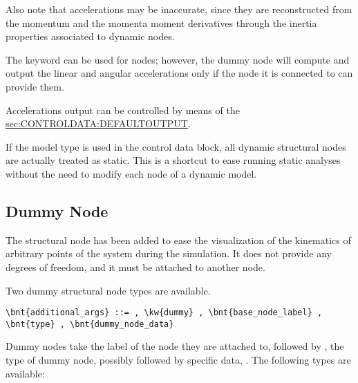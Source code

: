 Also note that accelerations may be inaccurate, since they are reconstructed
from the momentum and the momenta moment derivatives through the inertia
properties associated to dynamic nodes.

The keyword  can be used for  nodes;
however, the dummy node will compute and output the linear and angular accelerations
only if the node it is connected to can provide them.

Accelerations output can be controlled by means of the
\hyperref{\kw{default output} statement}{\kw{default output} statement (see Section~}{)}{sec:CONTROLDATA:DEFAULTOUTPUT}.

If the  model type is used in the control data block,
all dynamic structural nodes are actually treated as static.
This is a shortcut to ease running static analyses without the need
to modify each node of a dynamic model.

\subsection{Dummy Node}
\label{sec:NODE:STRUCTURAL:DUMMY}
The  structural node has been added to ease the visualization
of the kinematics of arbitrary points of the system
during the simulation. 
It does not provide any degrees of freedom, and it must be attached
to another node.

Two dummy structural node types are available.
\begin{Verbatim}[commandchars=\\\{\}]
    \bnt{additional_args} ::= , \kw{dummy} , \bnt{base_node_label} , \bnt{type} , \bnt{dummy_node_data}
\end{Verbatim}

Dummy nodes take the label  of the node they are attached to, 
followed by , the type of dummy node, possibly followed by specific data,
.
The following types are available:

